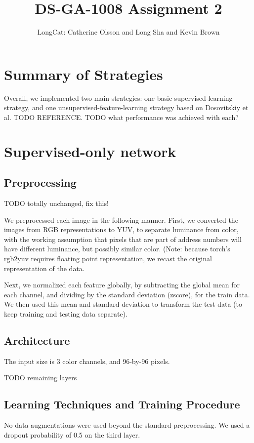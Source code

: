 \documentclass{article}
\title{DS-GA-1008 Assignment 2}
\author{LongCat: Catherine Olsson and Long Sha and Kevin Brown}
\begin{document}
 \maketitle

\section*{Summary of Strategies}

Overall, we implemented two main strategies: one basic supervised-learning strategy, and one unsupervised-feature-learning strategy based on Dosovitskiy et al. TODO REFERENCE. TODO what performance was achieved with each?

\section{Supervised-only network}

\subsection*{Preprocessing}

TODO totally unchanged, fix this!

We preprocessed each image in the following manner. First, we converted the
images from RGB representations to YUV, to separate luminance from color, with
the working assumption that pixels that are part of address numbers will have
different luminance, but possibly similar color. (Note: because torch's rgb2yuv
requires floating point representation, we recast the original representation of the data.

Next, we normalized each feature globally, by subtracting the global mean for
each channel, and dividing by the standard deviation (zscore), for the train
data. We then used this mean and standard deviation to transform the test data
(to keep training and testing data separate).

\subsection*{Architecture}

The input size is 3 color channels, and 96-by-96 pixels. 

TODO remaining layers

\subsection*{Learning Techniques and Training Procedure}
No data augmentations were used beyond the standard preprocessing. We used a dropout probability of 0.5 on the third layer.
\end{document}

